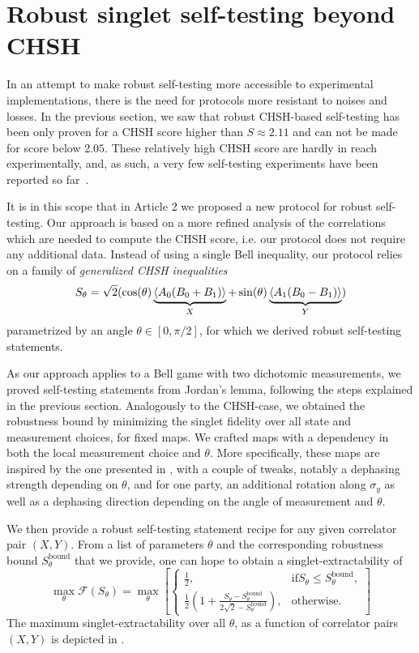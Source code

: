 \section{Robust singlet self-testing beyond CHSH}

In an attempt to make robust self-testing more accessible to experimental implementations, there is the need for protocols more resistant to noises and losses.
In the previous section, we saw that robust CHSH-based self-testing has been only proven for a CHSH score higher than $S\approx 2.11$ and can not be made for score below $2.05$.
These relatively high CHSH score are hardly in reach experimentally, and, as such, a very few self-testing experiments have been reported so far~\cite{Tan2017,Bancal2021}.

It is in this scope that in Article 2 we proposed a new protocol for robust self-testing.
Our approach is based on a more refined analysis of the correlations which are needed to compute the CHSH score, i.e. our protocol does not require any additional data.
Instead of using a single Bell inequality, our protocol relies on a family of \textit{generalized CHSH inequalities}
\begin{equation}
S_\theta = \sqrt{2}(\cos(\theta) \underbrace{\langle {A_0(B_0+B_1)} \rangle}_{X} + \sin(\theta)\underbrace{\langle {A_1(B_0-B_1)} \rangle}_{Y})
\end{equation}
parametrized by an angle $\theta \in [0,\pi/2]$, for which we derived robust self-testing statements.

As our approach applies to a Bell game with two dichotomic measurements, we proved self-testing statements from Jordan's lemma, following the steps explained in the previous section. 
Analogously to the CHSH-case, we obtained the robustness bound by minimizing the singlet fidelity over all state and measurement choices, for fixed maps.
We crafted maps with a dependency in both the local measurement choice and $\theta$.
More specifically, these maps are inspired by the one presented in , with a couple of tweaks, notably a dephasing strength depending on $\theta$, and for one party, an additional rotation along $\sigma_y$ as well as a dephasing direction depending on the angle of measurement and $\theta$.

We then provide a robust self-testing statement recipe for any given correlator pair $(X,Y)$.
From a list of parameters $\theta$ and the corresponding robustness bound $S_\theta^\text{bound}$ that we provide, one can hope to obtain a singlet-extractability of 
\begin{equation}
	\max_\theta \mathcal{F}(S_\theta) = \max_\theta \left[ \begin{cases}
			\frac{1}{2},& \text{if} S_\theta \leq S_\theta^\text{bound}, \\
			\frac{1}{2}\left(1+\frac{S_\theta - S_\theta^\text{bound}}{2\sqrt{2}-S_\theta^\text{bound}}\right), & \text{otherwise}.
	\end{cases} \right]
	\label{eq:singlet-extractability-theta}
\end{equation}
The maximum singlet-extractability over all $\theta$, as a function of correlator pairs $(X,Y)$ is depicted in .

